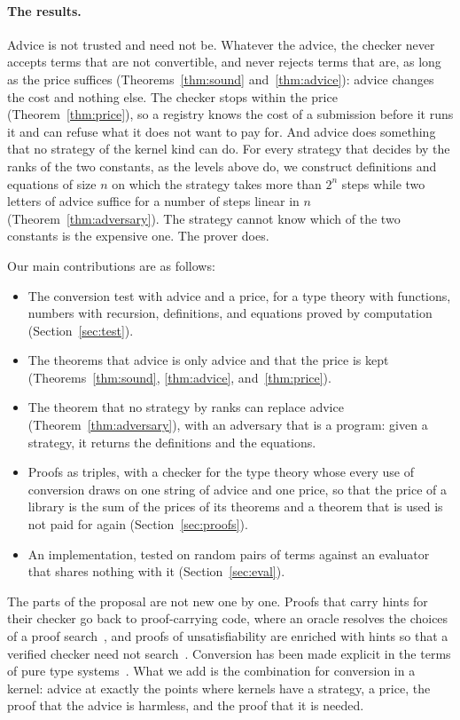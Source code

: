 \documentclass[acmsmall,nonacm,screen]{acmart}
\begin{document}
\paragraph{The results.} Advice is not trusted and need not be. Whatever the advice, the
checker never accepts terms that are not convertible, and never rejects terms that are, as
long as the price suffices (Theorems~\ref{thm:sound} and~\ref{thm:advice}): advice changes
the cost and nothing else. The checker stops within the price (Theorem~\ref{thm:price}), so
a registry knows the cost of a submission before it runs it and can refuse what it does not
want to pay for. And advice does something that no strategy of the kernel kind can do. For
every strategy that decides by the ranks of the two constants, as the levels above do, we
construct definitions and equations of size $n$ on which the strategy takes more than $2^n$
steps while two letters of advice suffice for a number of steps linear in $n$
(Theorem~\ref{thm:adversary}). The strategy cannot know which of the two constants is the
expensive one. The prover does.

Our main contributions are as follows:
\begin{itemize}
\item The conversion test with advice and a price, for a type theory with functions,
  numbers with recursion, definitions, and equations proved by computation
  (Section~\ref{sec:test}).
\item The theorems that advice is only advice and that the price is kept
  (Theorems~\ref{thm:sound}, \ref{thm:advice}, and~\ref{thm:price}).
\item The theorem that no strategy by ranks can replace advice
  (Theorem~\ref{thm:adversary}), with an adversary that is a program: given a strategy, it
  returns the definitions and the equations.
\item Proofs as triples, with a checker for the type theory whose every use of conversion
  draws on one string of advice and one price, so that the price of a library is the sum of
  the prices of its theorems and a theorem that is used is not paid for again
  (Section~\ref{sec:proofs}).
\item An implementation, tested on \exPairs{} random pairs of terms against an evaluator
  that shares nothing with it (Section~\ref{sec:eval}).
\end{itemize}

The parts of the proposal are not new one by one. Proofs that carry hints for their checker
go back to proof-carrying code, where an oracle resolves the choices of a proof
search~\cite{necula2001}, and proofs of unsatisfiability are enriched with hints so that a
verified checker need not search~\cite{cruzfilipe2017}. Conversion has been made
explicit in the terms of pure type systems~\cite{vandoorn2013}. What we add is the
combination for conversion in a kernel: advice at exactly the points where kernels have a
strategy, a price, the proof that the advice is harmless, and the proof that it is needed.
\end{document}
